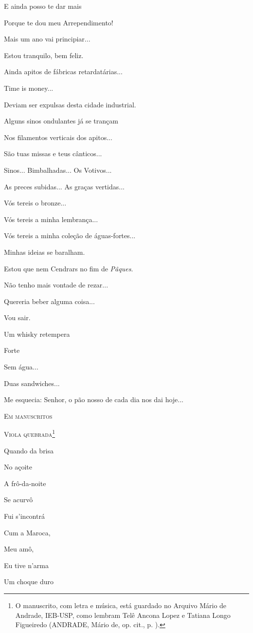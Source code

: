 E ainda posso te dar mais

Porque te dou meu Arrependimento!

Mais um ano vai principiar...

Estou tranquilo, bem feliz.

Ainda apitos de fábricas retardatárias...

Time is money...

Deviam ser expulsas desta cidade industrial.

Alguns sinos ondulantes já se trançam

Nos filamentos verticais dos apitos...

São tuas missas e teus cânticos...

Sinos... Bimbalhadas... Os Votivos...

As preces subidas... As graças vertidas...

Vós tereis o bronze...

Vós tereis a minha lembrança...

Vós tereis a minha coleção de águas-fortes...

Minhas ideias se baralham.

Estou que nem Cendrars no fim de \emph{Pâques}.

Não tenho mais vontade de rezar...

Quereria beber alguma coisa...

Vou sair.

Um whisky retempera

Forte

Sem água...

Duas sandwiches...

Me esquecia: Senhor, o pão nosso de cada dia nos dai hoje...

\textsc{Em manuscritos}

\textsc{Viola quebrada}\footnote{O manuscrito, com letra e música, está
  guardado no Arquivo Mário de Andrade, IEB-USP, como lembram Telê
  Ancona Lopez e Tatiana Longo Figueiredo (ANDRADE, Mário de, op. cit.,
  p. ).}

Quando da brisa

No açoite

A frô-da-noite

Se acurvô

Fui s'incontrá

Cum a Maroca,

Meu amô,

Eu tive n'arma

Um choque duro


